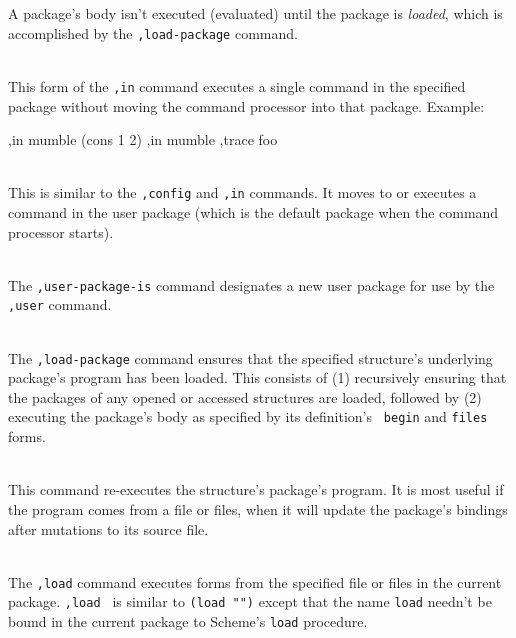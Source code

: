 \begin{description}
    A package's body isn't executed (evaluated) until the package is
    {\em loaded}, which is accomplished by the {\tt ,load-package}
    command.

\item {} \\
    This form of the {\tt,in} command executes a single command in the
    specified package without moving the command processor into that
    package.  Example:
\begin{example}
,in mumble (cons 1 2)
,in mumble ,trace foo
\end{example}

\item {} \\
    This is similar to the {\tt ,config} and {\tt ,in} commands.  It
    moves to or executes a command in the user package (which is the
    default package when the \hack{} command processor starts).

\item {} \\
    The {\tt,user-package-is} command designates a new user
    package for use by the {\tt,user} command.

\item {} \\
    The {\tt,load-package} command ensures that the specified structure's
    underlying package's program has been loaded.  This 
    consists of (1) recursively ensuring that the packages of any
    opened or accessed structures are loaded, followed by (2)
    executing the package's body as specified by its definition's {\tt
    begin} and {\tt files} forms.

\item {} \\
    This command re-executes the structure's package's program.  It
    is most useful if the program comes from a file or files, when
    it will update the package's bindings after mutations to its
    source file.

\item {} \\
    The {\tt,load} command executes forms from the specified file or
    files in the current package.  {\tt,load } is similar
    to {\tt(load "")}
    except that the name {\tt load} needn't be bound in the current
    package to Scheme's {\tt load} procedure.


\end{description}
